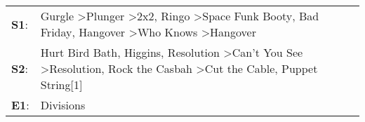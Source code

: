 \begin{supertabular}{p{0.03\textwidth}p{0.92\textwidth}}
 \textbf{S1}:  &  Gurgle\textsuperscript{} \textgreater \enspace Plunger\textsuperscript{} \textgreater \enspace 2x2\textsuperscript{}, \enspace Ringo\textsuperscript{} \textgreater \enspace Space Funk Booty\textsuperscript{}, \enspace Bad Friday\textsuperscript{}, \enspace Hangover\textsuperscript{} \textgreater \enspace Who Knows\textsuperscript{} \textgreater \enspace Hangover\textsuperscript{}  \enspace  \\
 \textbf{S2}:  &                             Hurt Bird Bath\textsuperscript{}, \enspace Higgins\textsuperscript{}, \enspace Resolution\textsuperscript{} \textgreater \enspace Can't You See\textsuperscript{} \textgreater \enspace Resolution\textsuperscript{}, \enspace Rock the Casbah\textsuperscript{} \textgreater \enspace Cut the Cable\textsuperscript{}, \enspace Puppet String[1]\textsuperscript{}  \enspace  \\
 \textbf{E1}:  &                                                                                                                                                                                                                                                                                                                                                                     Divisions\textsuperscript{}  \enspace  \\
\end{supertabular}

